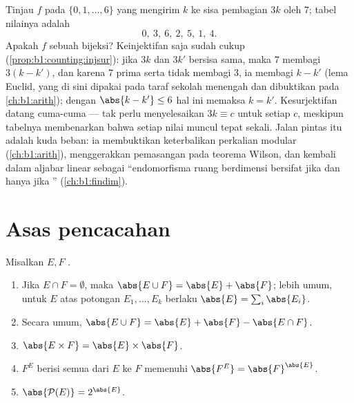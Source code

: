 \begin{example}\label{ex:b1:counting:mod7}
Tinjau  $f$ pada $\{0, 1, \dots, 6\}$ yang mengirim $k$ ke
sisa pembagian $3k$ oleh $7$; tabel nilainya adalah
\[
0,\ 3,\ 6,\ 2,\ 5,\ 1,\ 4 .
\]
Apakah $f$ sebuah bijeksi? Keinjektifan saja sudah cukup
(\cref{prop:b1:counting:injsur}): jika $3k$ dan $3k'$ bersisa sama,
maka $7$ membagi $3(k - k')$, dan karena $7$ prima serta
tidak membagi $3$, ia membagi $k - k'$ (lema Euclid, yang di sini dipakai
pada taraf sekolah menengah dan dibuktikan pada \cref{ch:b1:arith}); dengan
$\abs{k - k'} \leq 6$ hal ini memaksa $k = k'$. Kesurjektifan datang
cuma-cuma --- tak perlu menyelesaikan $3k \equiv c$ untuk setiap $c$, meskipun
tabelnya membenarkan bahwa setiap nilai muncul tepat sekali. Jalan pintas itu
adalah kuda beban: ia membuktikan keterbalikan perkalian
modular (\cref{ch:b1:arith}), menggerakkan pemasangan pada
teorema Wilson, dan kembali dalam aljabar linear sebagai ``endomorfisma
ruang berdimensi  bersifat  jika dan hanya jika
'' (\cref{ch:b1:findim}).
\end{example}

\section{Asas pencacahan}

\begin{proposition}\label{prop:b1:counting:rules}
Misalkan $E, F$ .
\begin{enumerate}
  \item Jika $E \cap F = \emptyset$, maka $\abs{E \cup F} = \abs{E} +
        \abs{F}$; lebih umum, untuk  $E$ atas potongan
        $E_1, \dots, E_k$ berlaku $\abs{E} = \sum_i \abs{E_i}$.
  \item Secara umum, $\abs{E \cup F} = \abs{E} + \abs{F} - \abs{E \cap
        F}$.
  \item $\abs{E \times F} = \abs{E} \times \abs{F}$.
  \item {} $F^E$ berisi semua  dari $E$ ke $F$ memenuhi
        $\abs{F^E} = \abs{F}^{\abs{E}}$.
  \item $\abs{\mathcal{P}(E)} = 2^{\abs{E}}$.
\end{enumerate}
\end{proposition}

